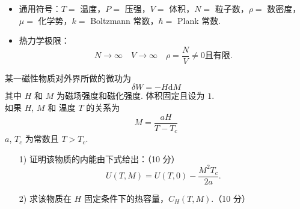 \documentclass{assignment}
\begin{document}
\begin{itemize}
    \item 通用符号：$T=$ 温度，$P=$ 压强，$V=$ 体积，$N=$ 粒子数，$\rho=$ 数密度，$\mu=$ 化学势，$k=$ Boltzmann 常数，$\hbar=$ Plank 常数.
    \item 热力学极限：
    \[
        N\rightarrow\infty\quad V\rightarrow\infty\quad\rho=\frac{N}{V}\neq 0\text{且有限}.
    \]
\end{itemize}
\begin{prob}
    某一磁性物质对外界所做的微功为
    \[
        \delta W=-H\mathrm{d}M
    \]
    其中 $H$ 和 $M$ 为磁场强度和磁化强度. 体积固定且设为 $1$.\\
    如果 $H$, $M$ 和 温度 $T$ 的关系为
    \[
        M=\frac{aH}{T-T_c}
    \]
    $a$, $T_c$ 为常数且 $T>T_c$.
    \begin{itemize}
        \item[1)] 证明该物质的内能由下式给出：（10 分）
        \[
            U(T,M)=U(T,0)-\frac{M^2T_c}{2a}.
        \]
        \item[2)] 求该物质在 $H$ 固定条件下的热容量，$C_H(T,M)$.（10 分）
    \end{itemize}
\end{prob}
\end{document}
